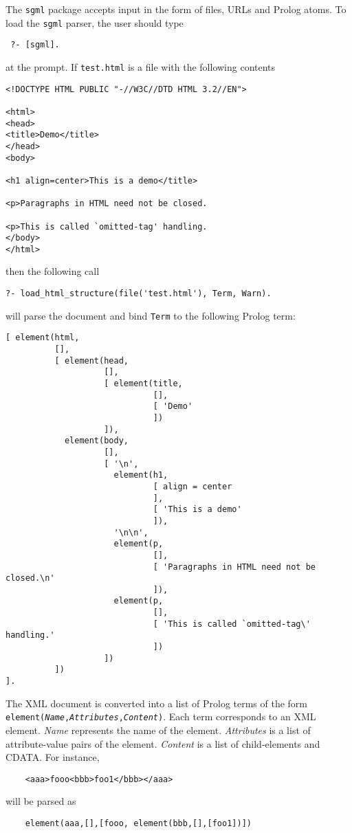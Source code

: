 The {\tt sgml} package accepts
input in the form of files, URLs and Prolog atoms.
To load the {\tt sgml} parser, the user should type
\begin{verbatim}
 ?- [sgml].  
\end{verbatim}
at the prompt.
If {\tt test.html} is a file with the following contents 
\begin{verbatim}
<!DOCTYPE HTML PUBLIC "-//W3C//DTD HTML 3.2//EN">

<html>
<head>
<title>Demo</title>
</head>
<body>

<h1 align=center>This is a demo</title>

<p>Paragraphs in HTML need not be closed.

<p>This is called `omitted-tag' handling.
</body>
</html>
\end{verbatim}
then the following call
\begin{verbatim}
?- load_html_structure(file('test.html'), Term, Warn).
\end{verbatim}
will parse the document and bind {\tt Term} to the following Prolog term: 
\begin{verbatim}
[ element(html,
          [],
          [ element(head,
                    [],
                    [ element(title,
                              [],
                              [ 'Demo'
                              ])
                    ]),
            element(body,
                    [],
                    [ '\n',
                      element(h1,
                              [ align = center
                              ],
                              [ 'This is a demo'
                              ]),
                      '\n\n',
                      element(p,
                              [],
                              [ 'Paragraphs in HTML need not be closed.\n'
                              ]),
                      element(p,
                              [],
                              [ 'This is called `omitted-tag\' handling.'
                              ])
                    ])
          ])
].
\end{verbatim}



\noindent
The XML document is converted into a list of Prolog terms of the form {\tt
  element(\emph{Name},\emph{Attributes},\emph{Content})}.  Each term
corresponds to an XML element. \emph{Name} represents the name of the element.
\emph{Attributes} is a list of attribute-value pairs of the element.  
\emph{Content} is a list of child-elements and CDATA.
For instance, 
\begin{verbatim}
    <aaa>fooo<bbb>foo1</bbb></aaa>  
\end{verbatim}
will be parsed as
\begin{verbatim}
    element(aaa,[],[fooo, element(bbb,[],[foo1])])  
\end{verbatim}

